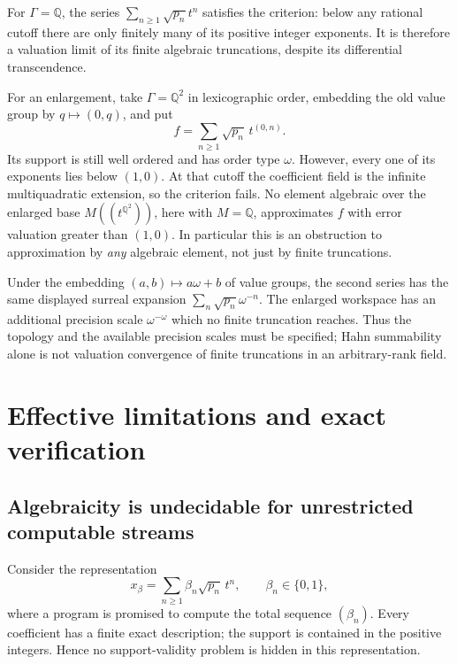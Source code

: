 \documentclass[11pt,a4paper]{article}
\numberwithin{equation}{section}
\theoremstyle{definition}
\theoremstyle{remark}
\newcommand{\Q}{\mathbb Q}
\begin{document}
For $\Gamma=\Q$, the series $\sum_{n\geq1}\sqrt{p_n}t^n$ satisfies the
criterion: below any rational cutoff there are only finitely many of its
positive integer exponents. It is therefore a valuation limit of its
finite algebraic truncations, despite its differential transcendence.

For an enlargement, take $\Gamma=\Q^2$ in lexicographic order,
embedding the old value group by $q\mapsto(0,q)$, and put
\[
 f=\sum_{n\geq1}\sqrt{p_n}\,t^{(0,n)}.
\]
Its support is still well ordered and has order type $\omega$. However,
every one of its exponents lies below $(1,0)$. At that cutoff the
coefficient field is the infinite multiquadratic extension, so the
criterion fails. No element algebraic over the enlarged base
$M((t^{\Q^2}))$, here with $M=\Q$, approximates $f$ with error valuation
greater than $(1,0)$. In particular this is an obstruction to approximation
by \emph{any} algebraic element, not just by finite truncations.

Under the embedding $(a,b)\mapsto a\omega+b$ of value groups, the
second series has the same displayed surreal expansion
$\sum_n\sqrt{p_n}\omega^{-n}$. The enlarged workspace has an additional
precision scale $\omega^{-\omega}$ which no finite truncation reaches.
Thus the topology and the available precision scales must be specified;
Hahn summability alone is not valuation convergence of finite truncations
in an arbitrary-rank field.

\section{Effective limitations and exact verification}\label{tail:sec:effective}

\subsection{Algebraicity is undecidable for unrestricted computable streams}
Consider the representation
\[
 x_\beta=\sum_{n\geq1}\beta_n\sqrt{p_n}\,t^n,
 \qquad \beta_n\in\{0,1\},
\]
where a program is promised to compute the total sequence $(\beta_n)$.
Every coefficient has a finite exact description; the support is
contained in the positive integers. Hence no support-validity problem
is hidden in this representation.
\end{document}
